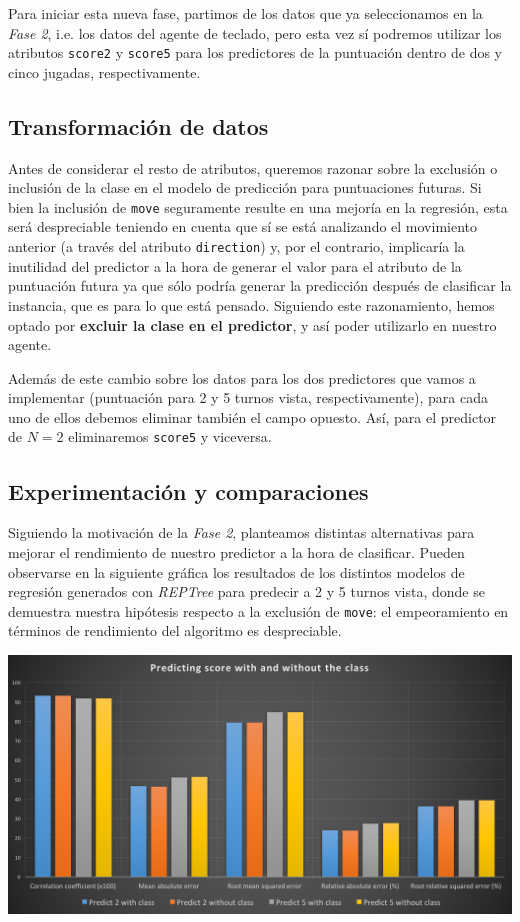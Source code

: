 \documentclass[12pt]{article}
\begin{document}
Para iniciar esta nueva fase, partimos de los datos que ya seleccionamos en la \emph{Fase 2}, i.e. los datos del agente de teclado, pero esta vez sí podremos utilizar los atributos \texttt{score2} y \texttt{score5} para los predictores de la puntuación dentro de dos y cinco jugadas, respectivamente.

\subsection{Transformación de datos}

Antes de considerar el resto de atributos, queremos razonar sobre la exclusión o inclusión de la clase en el modelo de predicción para puntuaciones futuras. Si bien la inclusión de \texttt{move} seguramente resulte en una mejoría en la regresión, esta será despreciable teniendo en cuenta que sí se está analizando el movimiento anterior (a través del atributo \texttt{direction}) y, por el contrario, implicaría la inutilidad del predictor a la hora de generar el valor para el atributo de la puntuación futura ya que sólo podría generar la predicción después de clasificar la instancia, que es para lo que está pensado. Siguiendo este razonamiento, hemos optado por \textbf{excluir la clase en el predictor}, y así poder utilizarlo en nuestro agente.

Además de este cambio sobre los datos para los dos predictores que vamos a implementar (puntuación para 2 y 5 turnos vista, respectivamente), para cada uno de ellos debemos eliminar también el campo opuesto. Así, para el predictor de $N=2$ eliminaremos \texttt{score5} y viceversa.

\subsection{Experimentación y comparaciones}

Siguiendo la motivación de la \emph{Fase 2}, planteamos distintas alternativas para mejorar el rendimiento de nuestro predictor a la hora de clasificar. Pueden observarse en la siguiente gráfica los resultados de los distintos modelos de regresión generados con \emph{REPTree} para predecir a 2 y 5 turnos vista, donde se demuestra nuestra hipótesis respecto a la exclusión de \texttt{move}: el empeoramiento en términos de rendimiento del algoritmo es despreciable.

\vspace{0.3cm}

\noindent \includegraphics[width=\textwidth]{class_or_no}
\end{document}
